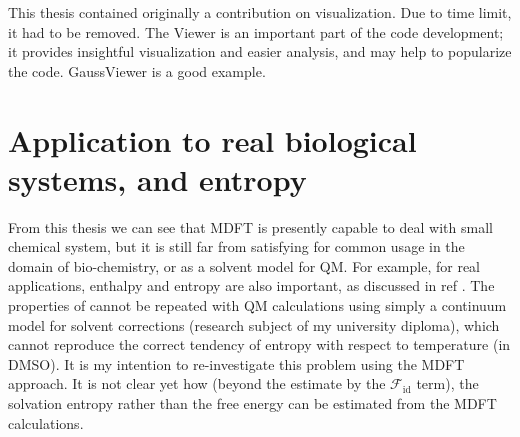 This thesis contained originally a contribution on visualization.
Due to time limit, it had to be removed. The Viewer is an important
part of the code development; it provides insightful visualization
and easier analysis, and may help to popularize the code. GaussViewer
is a good example.

\section{Application to real biological systems, and entropy}

From this thesis we can see that \acs{MDFT} is presently capable
to deal with small chemical system, but it is still far from satisfying
for common usage in the domain of bio-chemistry, or as a solvent model
for \acs{QM}. For example, for real applications, enthalpy and entropy
are also important, as discussed in ref \citep{Mn-oxo}. The properties
of \citep{Mn-oxo} cannot be repeated with \acs{QM} calculations
using simply a continuum model for solvent corrections (research subject
of my university diploma), which cannot reproduce the correct tendency
of entropy with respect to temperature (in DMSO). It is my intention
to re-investigate this problem using the \acs{MDFT} approach. It
is not clear yet how (beyond the estimate by the $\mathcal{F}_{\mathrm{id}}$
term), the solvation entropy rather than the free energy can be estimated
from the \acs{MDFT} calculations.
